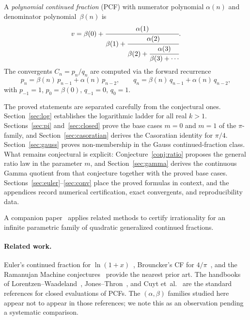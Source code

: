 \documentclass[11pt,a4paper]{article}
\theoremstyle{plain}
\theoremstyle{definition}
\theoremstyle{remark}
\begin{document}
A \emph{polynomial continued fraction} (PCF) with numerator polynomial
$\alpha(n)$ and denominator polynomial~$\beta(n)$ is
\begin{equation}\label{eq:pcf}
  v = \beta(0) + \cfrac{\alpha(1)}{\beta(1) +
  \cfrac{\alpha(2)}{\beta(2) + \cfrac{\alpha(3)}{\beta(3) + \cdots}}}.
\end{equation}
The convergents $C_n = p_n/q_n$ are computed via the forward recurrence
\begin{equation}\label{eq:rec}
  p_n = \beta(n)\,p_{n-1} + \alpha(n)\,p_{n-2}, \qquad
  q_n = \beta(n)\,q_{n-1} + \alpha(n)\,q_{n-2},
\end{equation}
with $p_{-1} = 1$, $p_0 = \beta(0)$, $q_{-1} = 0$, $q_0 = 1$.

The proved statements are separated carefully from the conjectural ones.
Section~\ref{sec:log} establishes the logarithmic ladder for all real $k>1$.
Sections~\ref{sec:pi} and~\ref{sec:closed} prove the base cases $m=0$ and
$m=1$ of the $\pi$-family, and Section~\ref{sec:casoratian} derives the
Casoratian identity for $\pi/4$. Section~\ref{sec:gauss} proves
non-membership in the Gauss continued-fraction class. What remains
conjectural is explicit: Conjecture~\ref{conj:ratio} proposes the general
ratio law in the parameter $m$, and Section~\ref{sec:gamma} derives the
continuous Gamma quotient from that conjecture together with the proved
base cases. Sections~\ref{sec:euler}--\ref{sec:conv} place the proved
formulas in context, and the appendices record numerical certification,
exact convergents, and reproducibility data.

A companion paper~\cite{B2} applies related methods to certify
irrationality for an infinite parametric family of quadratic generalized
continued fractions.

\paragraph{Related work.}
Euler's continued fraction for $\ln(1{+}x)$~\cite[\S2.4]{lorentzen2008},
Brouncker's CF for $4/\pi$~\cite[\S6.1]{lorentzen2008}, and the Ramanujan
Machine conjectures~\cite{raayoni2021} provide the nearest prior art.
The handbooks of Lorentzen--Waadeland~\cite{lorentzen2008},
Jones--Thron~\cite{jones1980}, and Cuyt et~al.~\cite{cuyt2008} are the
standard references for closed evaluations of PCFs.
The $(\alpha,\beta)$ families studied here appear not to appear in those
references; we note this as an observation pending a systematic
comparison.
\end{document}
